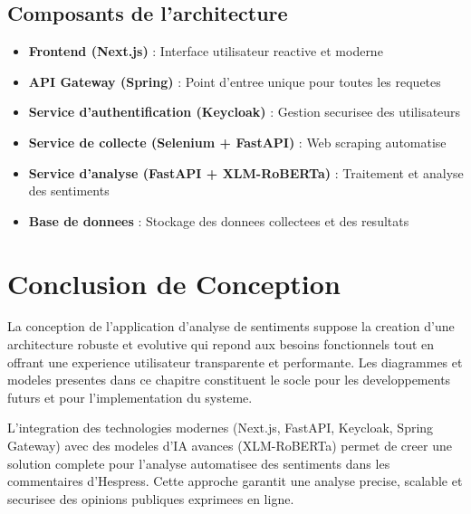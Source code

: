 \subsection{Composants de l'architecture}

\begin{itemize}
    \item \textbf{Frontend (Next.js)} : Interface utilisateur reactive et moderne
    \item \textbf{API Gateway (Spring)} : Point d'entree unique pour toutes les requetes
    \item \textbf{Service d'authentification (Keycloak)} : Gestion securisee des utilisateurs
    \item \textbf{Service de collecte (Selenium + FastAPI)} : Web scraping automatise
    \item \textbf{Service d'analyse (FastAPI + XLM-RoBERTa)} : Traitement et analyse des sentiments
    \item \textbf{Base de donnees} : Stockage des donnees collectees et des resultats
\end{itemize}

\section{Conclusion de Conception}

La conception de l'application d'analyse de sentiments suppose la creation d'une architecture robuste et evolutive qui repond aux besoins fonctionnels tout en offrant une experience utilisateur transparente et performante. Les diagrammes et modeles presentes dans ce chapitre constituent le socle pour les developpements futurs et pour l'implementation du systeme.

L'integration des technologies modernes (Next.js, FastAPI, Keycloak, Spring Gateway) avec des modeles d'IA avances (XLM-RoBERTa) permet de creer une solution complete pour l'analyse automatisee des sentiments dans les commentaires d'Hespress. Cette approche garantit une analyse precise, scalable et securisee des opinions publiques exprimees en ligne.

